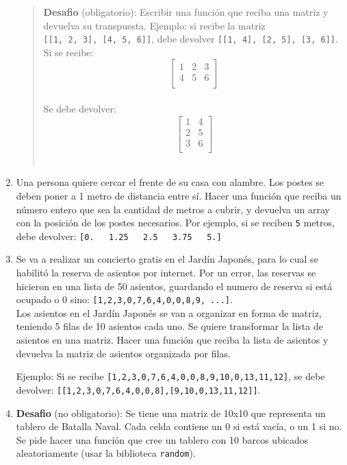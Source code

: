 \documentclass[
  letterpaper,
  DIV=11,
  numbers=noendperiod]{scrreprt}
\begin{document}
\begin{enumerate}
  \begin{quote}
  \textbf{Desafio} (obligatorio): Escribir una función que reciba una
  matriz y devuelva su transpuesta. Ejemplo: si recibe la matriz
  \texttt{{[}{[}1,\ 2,\ 3{]},\ {[}4,\ 5,\ 6{]}{]}}, debe devolver
  \texttt{{[}{[}1,\ 4{]},\ {[}2,\ 5{]},\ {[}3,\ 6{]}{]}}. Si se
  recibe:\\
  \[
  \begin{bmatrix}
  1 & 2 & 3  \\
  4 & 5 & 6  \\
  \end{bmatrix}
  \]\\
  Se debe devolver:\\
  \[
  \begin{bmatrix}
  1 & 4 \\
  2 & 5 \\
  3 & 6 \\
  \end{bmatrix}
  \]\\
  \end{quote}
\item
  Una persona quiere cercar el frente de su casa con alambre. Los postes
  se deben poner a 1 metro de distancia entre sí. Hacer una función que
  reciba un número entero que sea la cantidad de metros a cubrir, y
  devuelva un array con la posición de los postes necesarios. Por
  ejemplo, si se reciben \texttt{5} metros, debe devolver:
  \texttt{{[}0.\ \ \ 1.25\ \ \ 2.5\ \ \ 3.75\ \ \ 5.{]}}
\item
  Se va a realizar un concierto gratis en el Jardín Japonés, para lo
  cual se habilitó la reserva de asientos por internet. Por un error,
  las reservas se hicieron en una lista de 50 asientos, guardando el
  numero de reserva si está ocupado o 0 sino:
  \texttt{{[}1,2,3,0,7,6,4,0,0,8,9,\ ...{]}}.\\
  Los asientos en el Jardín Japonés se van a organizar en forma de
  matriz, teniendo 5 filas de 10 asientos cada uno. Se quiere
  transformar la lista de asientos en una matriz. Hacer una función que
  reciba la lista de asientos y devuelva la matriz de asientos
  organizada por filas.

  Ejemplo: Si se recibe
  \texttt{{[}1,2,3,0,7,6,4,0,0,8,9,10,0,13,11,12{]}}, se debe devolver:
  \texttt{{[}{[}1,2,3,0,7,6,4,0,0,8{]},{[}9,10,0,13,11,12{]}{]}}.
\item
  \textbf{Desafio} (no obligatorio): Se tiene una matriz de 10x10 que
  representa un tablero de Batalla Naval. Cada celda contiene un 0 si
  está vacía, o un 1 si no. Se pide hacer una función que cree un
  tablero con 10 barcos ubicados aleatoriamente (usar la biblioteca
  \texttt{random}).


\end{enumerate}
\end{document}
